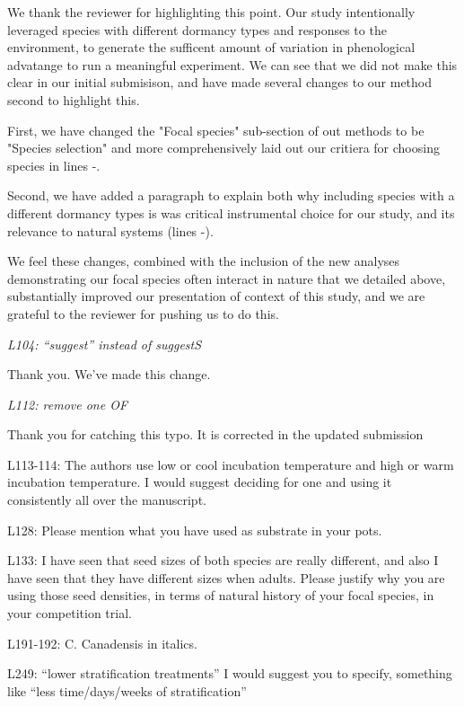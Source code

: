 \documentclass[11pt]{article}
\begin{document}
We thank the reviewer for highlighting this point. Our study intentionally leveraged species with different dormancy types and responses to the environment, to generate the sufficent amount of variation in phenological advatange to run a meaningful experiment. We can see that we did not make this clear in our initial submisison, and have made several changes to our method second to highlight this.

First, we have changed the "Focal species" sub-section of out methods to be "Species selection" and more comprehensively laid out our critiera for choosing species in lines -.

Second, we have added a paragraph to explain both why including species with a different dormancy types is was critical instrumental choice for our study, and its relevance to natural systems (lines -).

We feel these changes, combined with the inclusion of the new analyses demonstrating our focal species often interact in nature that we detailed above, substantially improved our presentation of context of this study, and we are grateful to the reviewer for pushing us to do this.

\emph{L104: “suggest” instead of suggestS}

Thank you. We've made this change.

\emph{L112: remove one OF}

Thank you for catching this typo. It is corrected in the updated submission

L113-114: The authors use low or cool incubation temperature and high or warm incubation temperature. I would suggest deciding for one and using it consistently all over the manuscript.

L128: Please mention what you have used as substrate in your pots.

L133: I have seen that seed sizes of both species are really different, and also I have seen that they have different sizes when adults. Please justify why you are using those seed densities, in terms of natural history of your focal species, in your competition trial.

L191-192: C. Canadensis in italics.

L249: “lower stratification treatments” I would suggest you to specify, something like “less time/days/weeks of stratification”
\end{document}
